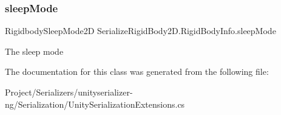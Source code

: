 \subsubsection{\texorpdfstring{sleep\+Mode}{sleepMode}}
{\footnotesize\ttfamily Rigidbody\+Sleep\+Mode2D Serialize\+Rigid\+Body2\+D.\+Rigid\+Body\+Info.\+sleep\+Mode}



The sleep mode 



The documentation for this class was generated from the following file\+:\begin{DoxyCompactItemize}
\item 
Project/\+Serializers/unityserializer-\/ng/\+Serialization/Unity\+Serialization\+Extensions.\+cs\end{DoxyCompactItemize}
